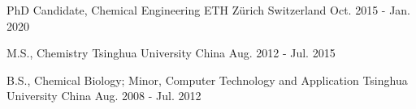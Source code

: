 

\begin{cventries}
\cventry
{PhD Candidate, Chemical Engineering} %
{ETH Z\"{u}rich} %
{Switzerland} %
{Oct. 2015 - Jan. 2020} %
{
}

\cventry
{M.S., Chemistry} %
{Tsinghua University} %
{China} %
{Aug. 2012 - Jul. 2015} %
{
}


\cventry
{B.S., Chemical Biology; Minor, Computer Technology and Application} %
{Tsinghua University} %
{China} %
{Aug. 2008 - Jul. 2012} %
{
}
   
\end{cventries}

